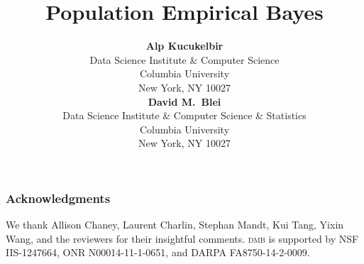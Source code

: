 \documentclass[]{article}
\title{Population Empirical Bayes}
\author{ {\bf Alp Kucukelbir} \\
Data Science Institute \& Computer Science \\
Columbia University\\
New York, NY 10027 \\
\And
{\bf David M.~Blei}  \\
Data Science Institute \& Computer Science \& Statistics \\
Columbia University\\
New York, NY 10027 \\
}
\begin{document}
\maketitle









\subsubsection*{Acknowledgments}
We thank Allison Chaney, Laurent Charlin, Stephan Mandt, Kui Tang, Yixin Wang,
and the reviewers for their insightful comments.
\textsc{dmb} is supported by NSF IIS-1247664, ONR N00014-11-1-0651, and
DARPA FA8750-14-2-0009.

\clearpage


\end{document}
